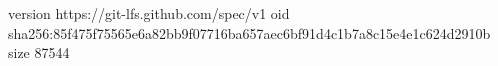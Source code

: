 version https://git-lfs.github.com/spec/v1
oid sha256:85f475f75565e6a82bb9f07716ba657aec6bf91d4c1b7a8c15e4e1c624d2910b
size 87544
